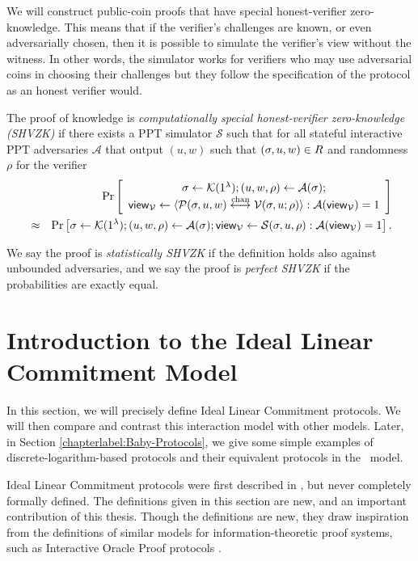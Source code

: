 We will construct public-coin proofs that have special honest-verifier zero-knowledge. This means that if the verifier's challenges are known, or even adversarially chosen, then it is possible to simulate the verifier's view without the witness.  In other words, the simulator works for verifiers who may use adversarial coins in choosing their challenges but they follow the specification of the protocol as an honest verifier would. 
\begin{definition}
The proof of knowledge is \emph{computationally special honest-verifier zero-knowledge (SHVZK)} if there exists a PPT simulator $\mathcal{S}$ such that for all stateful interactive PPT adversaries $\mathcal{A}$ that output $(u,w)$ such that $(\mathsf{\sigma},u,w)\in R$ and randomness $\rho$ for the verifier
\begin{eqnarray*}
&&\Pr \left[ \begin{array}{c}\mathsf{\sigma}\gets \mathcal{K}(1^{\lambda});(u, w, \rho) \leftarrow\mathcal{A}(\mathsf{\sigma}); \\
\mathsf{view}_{\mathcal{V}}\leftarrow \langle \mathcal{P}(\mathsf{\sigma},u,w)\overset{\textnormal{chan}}{\longleftrightarrow} \mathcal{V}(\mathsf{\sigma},u;\rho)\rangle: \mathcal{A}(\mathsf{view}_{\mathcal{V}})=1\end{array} \right]\\
&\approx &\Pr \left[ \mathsf{\sigma}\gets \mathcal{K}(1^{\lambda});(u, w, \rho) \leftarrow\mathcal{A}(\mathsf{\sigma}); \mathsf{view}_{\mathcal{V}}\leftarrow \mathcal{S}(\mathsf{\sigma},u,\rho): \mathcal{A}(\mathsf{view}_{\mathcal{V}})=1\right].
\end{eqnarray*}

We say the proof is \emph{statistically SHVZK} if the definition holds also against unbounded adversaries, and we say the proof is \emph{perfect SHVZK} if the probabilities are exactly equal.
\end{definition}

\section{Introduction to the Ideal Linear Commitment Model}
\label{formalILCmodel}

In this section, we will precisely define Ideal Linear Commitment protocols. We will then compare and contrast this interaction model with other models. Later, in Section \ref{chapterlabel:Baby-Protocols}, we give some simple examples of discrete-logarithm-based protocols and their equivalent protocols in the \ILC\ model. 

Ideal Linear Commitment protocols were first described in \cite{BootleCGGHJ17}, but never completely formally defined. The definitions given in this section are new, and an important contribution of this thesis. Though the definitions are new, they draw inspiration from the definitions of similar models for information-theoretic proof systems, such as Interactive Oracle Proof protocols \cite{Ben-SassonCS16}.

